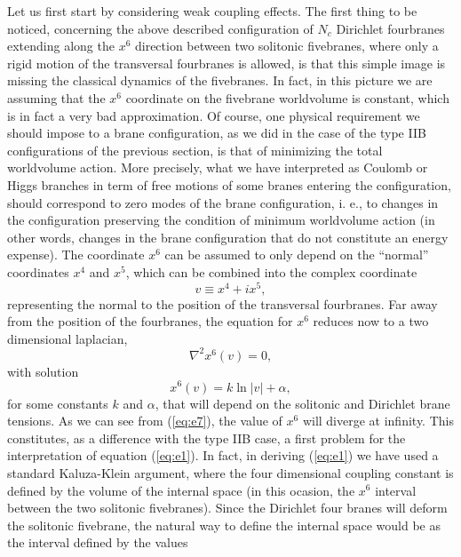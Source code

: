 Let us first start by considering weak coupling effects. The
first thing to be noticed, concerning the above described
configuration of $N_c$ Dirichlet fourbranes extending along the 
$x^6$ direction between two solitonic fivebranes, where only a
rigid motion of the  transversal fourbranes is allowed, is that
this simple image is missing the classical dynamics of the fivebranes. In
fact, in this picture we are assuming that the $x^6$ coordinate
on the fivebrane worldvolume is constant, which is in fact a very
bad approximation. Of course, one physical requirement we should
impose to a brane configuration, as we did in the case of the
type IIB configurations of the previous section, is that of
minimizing the total worldvolume action. More precisely, what we
have interpreted as Coulomb or Higgs branches in term of free
motions of some branes entering the configuration, should
correspond to zero modes of the brane configuration, i. e., to
changes in the configuration preserving the condition of
minimum worldvolume action (in other words, changes in the brane
configuration that do not constitute an energy expense). The coordinate $x^6$ 
can be assumed
to only depend on the ``normal'' coordinates $x^4$ and $x^5$,
which can be combined into the complex coordinate
\begin{equation}
v \equiv  x^4 + ix^5,
\label{eq:e5}
\end{equation}
representing the normal to the position of the transversal
fourbranes. Far away from the position of the fourbranes, the
equation for $x^6$ reduces now to a two dimensional
laplacian,
\begin{equation}
\nabla^2x^6(v)=0,
\label{eq:e6}
\end{equation}
with solution
\begin{equation}
x^6(v) = k \ln |v| + \alpha,
\label{eq:e7}
\end{equation}
for some constants $k$ and $\alpha$, that will depend on the solitonic and Dirichlet 
brane tensions. As we can see from (\ref{eq:e7}), the value of
$x^6$ will diverge at infinity. This constitutes, as a difference with 
the type IIB case, a first problem 
for the interpretation of equation (\ref{eq:e1}). In fact, in
deriving (\ref{eq:e1}) we have used a standard Kaluza-Klein
argument, where the four dimensional coupling constant is defined
by the volume of the internal space (in this ocasion, the $x^6$
interval between the two solitonic fivebranes). Since the Dirichlet four
branes will deform the solitonic fivebrane, the natural way to define
the internal space would be as the interval defined by the values
